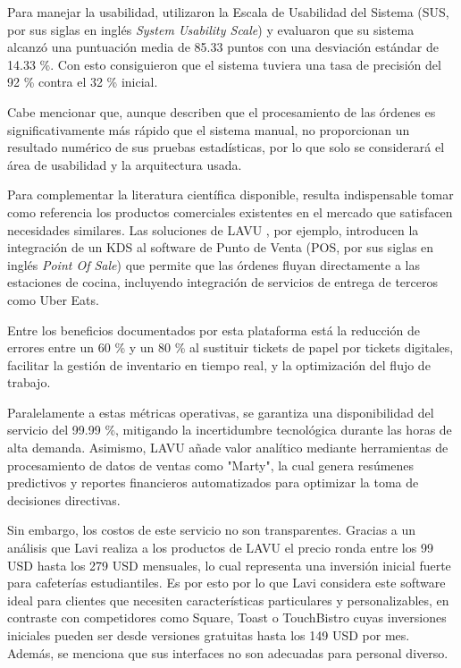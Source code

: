 Para manejar la usabilidad, utilizaron la Escala de Usabilidad del Sistema (SUS, por sus siglas en inglés \textit{System Usability Scale}) y evaluaron que su sistema alcanzó una puntuación media de 85.33 puntos con una desviación estándar de 14.33 \%. Con esto consiguieron que el sistema tuviera una tasa de precisión del 92 \% contra el 32 \% inicial.

Cabe mencionar que, aunque describen que el procesamiento de las órdenes es significativamente más rápido que el sistema manual, no proporcionan un resultado numérico de sus pruebas estadísticas, por lo que solo se considerará el área de usabilidad y la arquitectura usada. 

Para complementar la literatura científica disponible, resulta indispensable tomar como referencia los productos comerciales existentes en el mercado que satisfacen necesidades similares. Las soluciones de LAVU \cite{lavu2025kds}, por ejemplo, introducen la integración de un KDS al software de Punto de Venta (POS, por sus siglas en inglés \textit{Point Of Sale}) que permite que las órdenes fluyan directamente a las estaciones de cocina, incluyendo integración de servicios de entrega de terceros como Uber Eats.

Entre los beneficios documentados por esta plataforma está la reducción de errores entre un 60 \% y un 80 \% al sustituir tickets de papel por tickets digitales, facilitar la gestión de inventario en tiempo real, y la optimización del flujo de trabajo.

Paralelamente a estas métricas operativas, se garantiza una disponibilidad del servicio del 99.99 \%, mitigando la incertidumbre tecnológica durante las horas de alta demanda. Asimismo, LAVU añade valor analítico mediante herramientas de procesamiento de datos de ventas como "Marty"\cite{lavu2026demo}, la cual genera resúmenes predictivos y reportes financieros automatizados para optimizar la toma de decisiones directivas.

Sin embargo, los costos de este servicio no son transparentes. Gracias a un análisis que Lavi \cite{lavi2026lavu} realiza a los productos de LAVU el precio ronda entre los 99 USD hasta los 279 USD mensuales, lo cual representa una inversión inicial fuerte para cafeterías estudiantiles. Es por esto por lo que Lavi considera este software ideal para clientes que necesiten características particulares y personalizables, en contraste con competidores como Square, Toast o TouchBistro cuyas inversiones iniciales pueden ser desde versiones gratuitas hasta los 149 USD por mes. Además, se menciona que sus interfaces no son adecuadas para personal diverso. 


